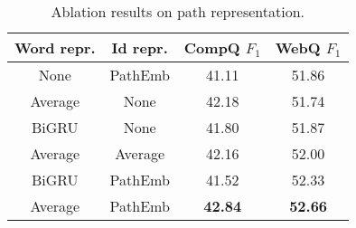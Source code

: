 \begin{table}[ht]
    \small
    \centering
    \begin{tabular} {c|c|c|c}
        \hline
        Word repr.  &  Id repr. &   CompQ $F_1$  & WebQ $F_1$ \\
        \hline
        None        &  PathEmb  &   41.11   & 51.86 \\      %
        Average     &  None     &   42.18   & 51.74 \\      %
        BiGRU       &  None     &   41.80   & 51.87 \\      %
        Average     &  Average  &   42.16   & 52.00 \\      %
        BiGRU       &  PathEmb  &   41.52   & 52.33 \\      %
        Average     &  PathEmb  &   \textbf{42.84}   & \textbf{52.66} \\      %
        \hline
    \end{tabular}
    \caption{Ablation results on path representation.}
    \label{tab:abl-pw}
\end{table}




